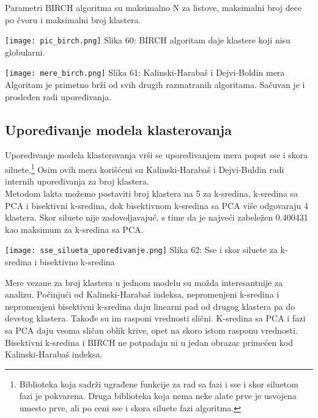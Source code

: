 \documentclass[a4paper]{article}
\begin{document}
{\begin{minipage}{0.45\textwidth}
Parametri BIRCH algoritma su maksimalno N za listove, maksimalni broj dece po čvoru i maksimalni broj klastera.\\
\end{minipage}
\noindent\begin{minipage}{0.05\textwidth}
\hphantom{a}
\end{minipage}
\noindent\begin{minipage}{0.48\textwidth}
\texttt{[image: pic\_birch.png]}
Slika 60: BIRCH algoritam daje klastere koji nisu globularni.\\
\end{minipage}

\texttt{[image: mere\_birch.png]}
\hphantom{aaaaaaaaaaaaaaaaaaaaaaaaa}Slika 61: Kalinski-Harabaš i Dejvi-Boldin mera\\

Algoritam je primetno brži od svih drugih razmatranih algoritama. Sačuvan je i prosleđen radi upoređivanja.

\subsection{Upoređivanje modela klasterovanja}
\label{upoređivanje_modela_klasterovanja}

Upoređivanje modela klasterovanja vrši se upoređivanjem mera poput sse i skora siluete.\footnote[9]{Biblioteka koja sadrži ugrađene funkcije za rad sa fazi i sse i skor siluetom fazi je pokvarena. Druga biblioteka koja nema neke alate prve je usvojena umesto prve, ali po ceni sse i skora siluete fazi algoritma.} Osim ovih mera korišćeni su Kalinski-Harabaš i Dejvi-Buldin radi internih upoređivanja za broj klastera.\\

Metodom lakta možemo postaviti broj klastera na 5 za k-sredina, k-sredina sa PCA i bisektivni k-sredina, dok bisektivnom k-sredina sa PCA više odgovaraju 4 klastera. Skor siluete nije zadovoljavajuć, s time da je najveći zabeležen 0.400431 kao maksimum za k-sredina sa PCA.

\noindent\begin{minipage}{0.9\textwidth}
\texttt{[image: sse\_silueta\_upoređivanje.png]}
\hphantom{aaaaaaaaaaaaa}Slika 62: Sse i skor siluete za k-sredina i bisektivno k-sredina\\
\end{minipage}

Mere vezane za broj klastera u jednom modelu su možda interesantnije za analizu. Počinjući od Kalinski-Harabaš indeksa, nepromenjeni k-sredina i nepromenjeni bisektivni k-sredina daju linearni pad od drugog klastera pa do devetog klastera. Takođe su im rasponi vrednosti slični. K-sredina sa PCA i fazi sa PCA daju veoma sličan oblik krive, opet na skoro istom rasponu vrednosti. Bisektivni k-sredina i BIRCH ne potpadaju ni u jedan obrazac primećen kod Kalinski-Harabaš indeksa.

}
\end{document}
